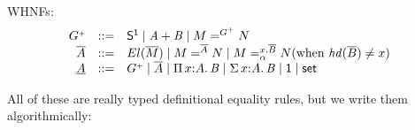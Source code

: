 \newcommand{\whnf}[1]{\ensuremath{\underbar{\ensuremath{#1}}}}
\newcommand{\neu}[1]{\ensuremath{\overline{\ensuremath{#1}}}}
\newcommand{\hd}[1]{\ensuremath{\mathit{hd}(#1)}}
\newcommand{\equivset}[2]{\ensuremath{#1 \cong #2}}

WHNFs:
\[
\begin{array}{rcl}
G\ep & ::= & {\sone} \mid \sm{A}{B} \mid {\iid{G\ep}{M}{N}} \\
\neu{A}  & ::= & \el{\neu{M}} \mid \iid{\neu{A}}{M}{N} \mid {\iidover{x.\neu{B}}{\alpha}{M}{N}} \text{(when $\hd{\neu B} \neq x$)} \\
\whnf{A} & ::= & G\ep \mid \neu{A} \mid \picl{x}{A}{B} \mid \sigmacl{x}{A}{B} \mid \unit \mid \set \\
\end{array}
\]

All of these are really typed definitional equality rules, but we write
them algorithmically:

